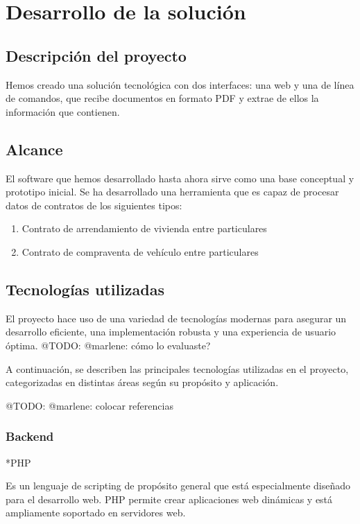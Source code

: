 \chapter{Desarrollo de la solución}\label{ch:chapter_4}


\section{Descripción del proyecto}

Hemos creado una solución tecnológica con dos interfaces: una web y una de línea de comandos, que recibe documentos
en formato PDF y extrae de ellos la información que contienen.


\section{Alcance}

El software que hemos desarrollado hasta ahora sirve como una base conceptual y prototipo inicial.
Se ha desarrollado una herramienta que es capaz de procesar datos de contratos de los siguientes tipos:

\begin{enumerate}
    \item Contrato de arrendamiento de vivienda entre particulares
    \item Contrato de compraventa de vehículo entre particulares
\end{enumerate}


\section{Tecnologías utilizadas}
El proyecto hace uso de una variedad de tecnologías modernas para asegurar un desarrollo eficiente,
una implementación robusta y una experiencia de usuario óptima.
\colorbox{color_highlight}{@TODO: @marlene:} cómo lo evaluaste?

A continuación, se describen las principales tecnologías utilizadas en
el proyecto, categorizadas en distintas áreas según su propósito y aplicación.

\colorbox{color_highlight}{@TODO: @marlene:} colocar referencias

\subsection*{Backend}

*PHP

Es un lenguaje de scripting de propósito general que está especialmente diseñado para el desarrollo web.
PHP permite crear aplicaciones web dinámicas y está ampliamente soportado en servidores web.

